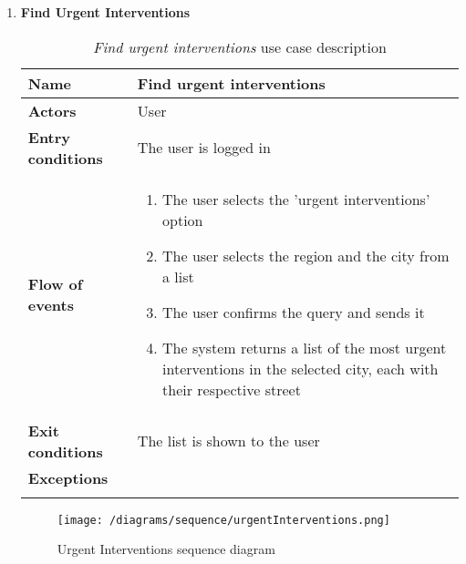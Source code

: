 \begin{enumerate}
				\FloatBarrier
			\item \textbf{Find Urgent Interventions}
				\begin{longtable}{p{0.25\linewidth}p{0.75\linewidth}}
					\toprule
					\textbf{Name} & \textbf{Find urgent interventions} \\
					\midrule
					\textbf{Actors} & User \\
					\midrule
					\textbf{Entry conditions} & The user is logged in \\
					\midrule
					\textbf{Flow of events} & 
					\begin{enumerate}
						\item The user selects the 'urgent interventions' option
						\item The user selects the region and the city from a list
						\item The user confirms the query and sends it
						\item The system returns a list of the most urgent interventions in the selected city, each with their respective street
					\end{enumerate} \\
					\midrule
					\textbf{Exit conditions} & The list is shown to the user\\
					\midrule
					\textbf{Exceptions} &  \\
					\bottomrule
					\caption{\emph{Find urgent interventions} use case description}
				\end{longtable}
			
				\begin{figure}[hbtp]
					\centering
					\texttt{[image: /diagrams/sequence/urgentInterventions.png]}
					\caption{Urgent Interventions sequence diagram}
				\end{figure}
			

\end{enumerate}
